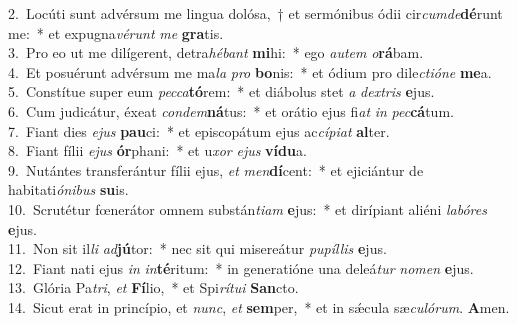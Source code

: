 {2.~}Locúti sunt advérsum me lingua dolósa,~† et sermónibus ódii cir\textit{cum}\textit{de}\textbf{dé}runt me:~* et expugna\textit{vé}\textit{runt} \textit{me} \textbf{gra}tis.\\
{3.~}Pro eo ut me dilígerent, detra\textit{hé}\textit{bant} \textbf{mi}hi:~* ego \textit{au}\textit{tem} \textit{o}\textbf{rá}bam.\\
{4.~}Et posuérunt advérsum me ma\textit{la} \textit{pro} \textbf{bo}nis:~* et ódium pro dile\textit{cti}\textit{ó}\textit{ne} \textbf{me}a.\\
{5.~}Constítue super eum \textit{pec}\textit{ca}\textbf{tó}rem:~* et diábolus stet \textit{a} \textit{dex}\textit{tris} \textbf{e}jus.\\
{6.~}Cum judicátur, éxeat \textit{con}\textit{dem}\textbf{ná}tus:~* et orátio ejus fi\textit{at} \textit{in} \textit{pec}\textbf{cá}tum.\\
{7.~}Fiant dies \textit{e}\textit{jus} \textbf{pau}ci:~* et episcopátum ejus ac\textit{cí}\textit{pi}\textit{at} \textbf{al}ter.\\
{8.~}Fiant fílii \textit{e}\textit{jus} \textbf{ór}phani:~* et u\textit{xor} \textit{e}\textit{jus} \textbf{ví}\textbf{du}a.\\
{9.~}Nutántes transferántur fílii ejus, \textit{et} \textit{men}\textbf{dí}cent:~* et ejiciántur de habitati\textit{ó}\textit{ni}\textit{bus} \textbf{su}is.\\
{10.~}Scrutétur fœnerátor omnem substán\textit{ti}\textit{am} \textbf{e}jus:~* et dirípiant aliéni \textit{la}\textit{bó}\textit{res} \textbf{e}jus.\\
{11.~}Non sit il\textit{li} \textit{ad}\textbf{jú}tor:~* nec sit qui misereátur \textit{pu}\textit{píl}\textit{lis} \textbf{e}jus.\\
{12.~}Fiant nati ejus \textit{in} \textit{in}\textbf{té}ritum:~* in generatióne una deleá\textit{tur} \textit{no}\textit{men} \textbf{e}jus.\\
{13.~}Glória Pa\textit{tri}, \textit{et} \textbf{Fí}lio,~* et Spi\textit{rí}\textit{tu}\textit{i} \textbf{San}cto.\\
{14.~}Sicut erat in princípio, et \textit{nunc}, \textit{et} \textbf{sem}per,~* et in sǽcula sæ\textit{cu}\textit{ló}\textit{rum}. \textbf{A}men.\\

